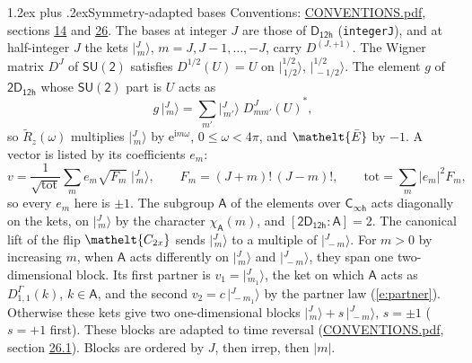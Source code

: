 \documentclass[10pt,a4paper]{article}
\makeatletter
\renewcommand\section{\@startsection{section}{1}{\z@}{-3ex plus -1ex minus -.2ex}%
  {1.2ex plus .2ex}{\normalfont\large\sffamily\bfseries\color{parttitle}}}
\numberwithin{equation}{section}
\newcommand{\eltfont}[1]{{\let\sigma\eltsigma\mathelt{#1}}}
\newcommand{\grp}[1]{\mathsf{#1}}
\newcommand{\elt}[1]{\eltfont{#1}}
\newcommand{\grpindex}[2]{[#1 : #2]}
\newcommand{\iunit}{\mathrm{i}}
\newcommand{\expe}{\mathrm{e}}
\newcommand{\irrJp}[2]{D^{(#1,#2)}}
\newcommand{\repD}[1]{D^{#1}}
\newcommand{\wignerD}[1]{D^{#1}}
\newcommand{\chiA}{\chi_{\grp{A}}}
\newcommand{\conj}[1]{{#1}^{*}}
\newcommand{\jm}[2]{\bigl\lvert{}^{#1}_{\,#2}\bigr\rangle}
\newcommand{\barred}[1]{\bar{#1}}
\newcommand{\lift}[1]{\tilde{#1}}
\makeatother
\begin{document}
\section{Symmetry-adapted bases}\label{s:bases}
Conventions: \href{../../CONVENTIONS.pdf}{CONVENTIONS.pdf}, sections \href{../../../rotation/CONVENTIONS.pdf\#conv.14}{14} and \href{../../CONVENTIONS.pdf\#conv.26}{26}.
\leavevmode\label{n:index.m}\label{n:vector.ket}The bases at integer $J$ are those of \href{../../../rotation/data/pdf/D12h.pdf}{$\grp{D_{12h}}$} (\texttt{integerJ}), and at half-integer $J$ the kets $\jm{J}{m}$, $m = J, J-1, \dots, -J$, carry $\irrJp{J}{+1}$. \label{n:matrix.wigner}The Wigner matrix $\wignerD{J}$ of $\grp{SU(2)}$ satisfies $\wignerD{1/2}(U) = U$ on $\jm{1/2}{1/2}$, $\jm{1/2}{-1/2}$. The element $g$ of $\grp{2D_{12h}}$ whose $\grp{SU(2)}$ part is $U$ acts as
\begin{equation}\label{e:action}g\,\jm{J}{m} = \sum_{m'} \jm{J}{m'}\; \conj{\wignerD{J}_{m m'}(U)},\end{equation}
so $\lift{R}_{z}(\omega)$ multiplies $\jm{J}{m}$ by $\expe^{\iunit m\omega}$, $0 \le \omega < 4\pi$, and $\elt{\barred{E}}$ by $-1$. \label{n:index.ketcoefficient}\label{n:vector.basis.symmetry}\label{n:index.ketweight}\label{n:index.total}A vector is listed by its coefficients $e_m$:
\begin{equation}\label{e:ket}v = \frac{1}{\sqrt{\mathrm{tot}}}\sum_m e_m\sqrt{F_m}\;\jm{J}{m},\qquad F_m = (J+m)!\,(J-m)!,\qquad \mathrm{tot} = \sum_m |e_m|^2F_m,\end{equation}
so every $e_m$ here is $\pm 1$.
\leavevmode\label{n:group.A}\label{n:function.character.abelian}The subgroup $\grp{A}$ of the elements over $\grp{C_{\infty h}}$ acts diagonally on the kets, on $\jm{J}{m}$ by the character $\chiA(m)$, and $\grpindex{\grp{2D_{12h}}}{\grp{A}} = 2$. The canonical lift of the flip $\elt{C_{2x}}$ sends $\jm{J}{m}$ to a multiple of $\jm{J}{-m}$. For $m > 0$ by increasing $m$, when $\grp{A}$ acts differently on $\jm{J}{m}$ and $\jm{J}{-m}$, they span one two-dimensional block. \label{n:index.partner.sign}Its first partner is $v_1 = \jm{J}{m_1}$, the ket on which $\grp{A}$ acts as $\repD{\Gamma}_{1,1}(k)$, $k \in \grp{A}$, and the second $v_2 = c\,\jm{J}{-m_1}$ by the partner law (\ref{e:partner}). \label{n:index.pair.sign}Otherwise these kets give two one-dimensional blocks $\jm{J}{m} + s\,\jm{J}{-m}$, $s = \pm 1$ ($s = +1$ first). These blocks are adapted to time reversal (\href{../../CONVENTIONS.pdf}{CONVENTIONS.pdf}, section \href{../../CONVENTIONS.pdf\#conv.26.1}{26.1}). Blocks are ordered by $J$, then irrep, then $|m|$.
\end{document}
